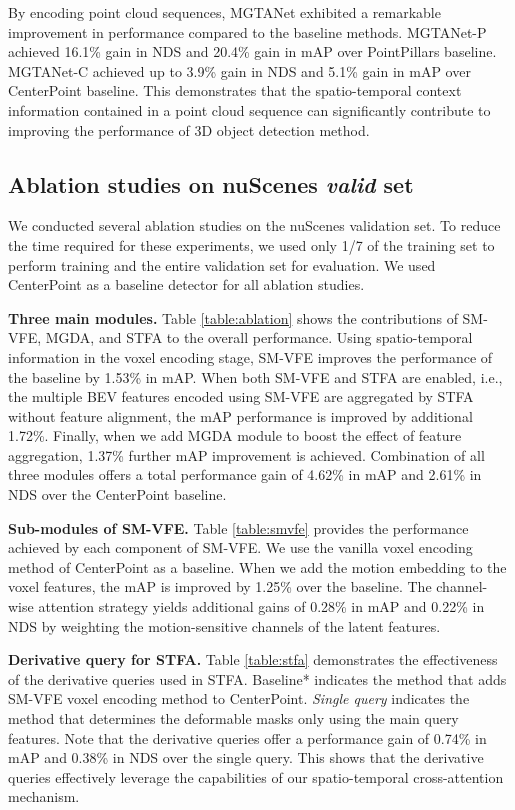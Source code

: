 \documentclass[letterpaper]{article} \usepackage{aaai23}  \usepackage{times}  \usepackage{helvet}  \usepackage{courier}  \usepackage[hyphens]{url}  \usepackage{graphicx} \urlstyle{rm} \def\UrlFont{\rm}  \usepackage{natbib}  \usepackage{caption} \frenchspacing  \setlength{\pdfpagewidth}{8.5in} \usepackage{algorithm}
\begin{document}
By encoding point cloud sequences, MGTANet exhibited a remarkable improvement in performance compared to the baseline methods. MGTANet-P achieved 16.1\% gain in NDS and 20.4\% gain in mAP over PointPillars baseline. 
MGTANet-C achieved up to 3.9\% gain in NDS and 5.1\% gain in mAP over CenterPoint baseline.
This demonstrates that the spatio-temporal context information contained in a point cloud sequence can significantly contribute to improving the performance of 3D object detection method.

\subsection{Ablation studies on nuScenes {\it valid} set}
We conducted several ablation studies on the nuScenes validation set. To reduce the time required for these experiments, we used only 1/7 of the training set to perform training and the entire validation set for evaluation. We used CenterPoint \cite{centerpoint} as a baseline detector for all ablation studies.

\noindent
{\bf Three main modules.} Table \ref{table:ablation} shows the contributions of SM-VFE, MGDA, and STFA to the overall performance. Using spatio-temporal information in the voxel encoding stage, SM-VFE improves the performance of the baseline by 1.53\% in mAP. When both SM-VFE and STFA are enabled, i.e., the multiple BEV features encoded using SM-VFE are aggregated by STFA without feature alignment, the mAP performance is improved by additional 1.72\%.  Finally, when we add MGDA module to boost the effect of feature aggregation, 1.37\% further mAP improvement is achieved. 
Combination of all three modules offers  a total performance gain of 4.62\% in mAP and  2.61\% in NDS over the CenterPoint baseline.

\noindent
{\bf Sub-modules of SM-VFE.} Table \ref{table:smvfe} provides the performance achieved by each component of SM-VFE. We use the vanilla voxel encoding method of CenterPoint as a baseline. When we add the motion embedding to the voxel features, the mAP is improved by 1.25\% over the baseline. The channel-wise attention strategy yields additional gains of 0.28\% in mAP and 0.22\% in NDS by weighting the motion-sensitive channels of the latent features.

\noindent
{\bf Derivative query for STFA.} 
Table \ref{table:stfa} demonstrates the effectiveness of the derivative queries used in STFA.
Baseline* indicates the method that adds SM-VFE voxel encoding method to CenterPoint.
{\it Single query} indicates the method that determines the deformable masks only using the main query features.
Note that the derivative queries offer a performance gain of 0.74\% in mAP and 0.38\% in NDS over the single query.  
This shows that the derivative queries effectively leverage the capabilities of our spatio-temporal cross-attention mechanism.
\end{document}
